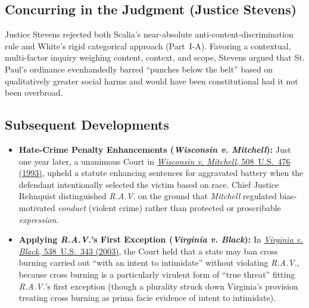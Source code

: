 \documentclass[12pt]{article}
\begin{document}
\subsection{Concurring in the Judgment (Justice Stevens)}

Justice Stevens rejected both Scalia's near-absolute anti-content-discrimination rule and White's rigid categorical approach (Part~I-A). Favoring a contextual, multi-factor inquiry weighing content, context, and scope, Stevens argued that St. Paul's ordinance evenhandedly barred ``punches below the belt'' based on qualitatively greater social harms and would have been constitutional had it not been overbroad.

\subsection{Subsequent Developments}

\begin{itemize}

\item \textbf{Hate-Crime Penalty Enhancements (\textit{Wisconsin v. Mitchell}):} Just one year later, a unanimous Court in \href{https://supreme.justia.com/cases/federal/us/508/476/}{\textit{Wisconsin v. Mitchell}, 508~U.S.~476 (1993)}, upheld a statute enhancing sentences for aggravated battery when the defendant intentionally selected the victim based on race. Chief Justice Rehnquist distinguished \textit{R.A.V.} on the ground that \textit{Mitchell} regulated bias-motivated \textit{conduct} (violent crime) rather than protected or proscribable \textit{expression}.
  \item \textbf{Applying \textit{R.A.V.}'s First Exception (\textit{Virginia v. Black}):} In \href{https://supreme.justia.com/cases/federal/us/538/343/}{\textit{Virginia v. Black}, 538~U.S.~343 (2003)}, the Court held that a state may ban cross burning carried out ``with an intent to intimidate'' without violating \textit{R.A.V.}, because cross burning is a particularly virulent form of ``true threat'' fitting \textit{R.A.V.}'s first exception (though a plurality struck down Virginia's provision treating cross burning as prima facie evidence of intent to intimidate).

\end{itemize}
\end{document}
